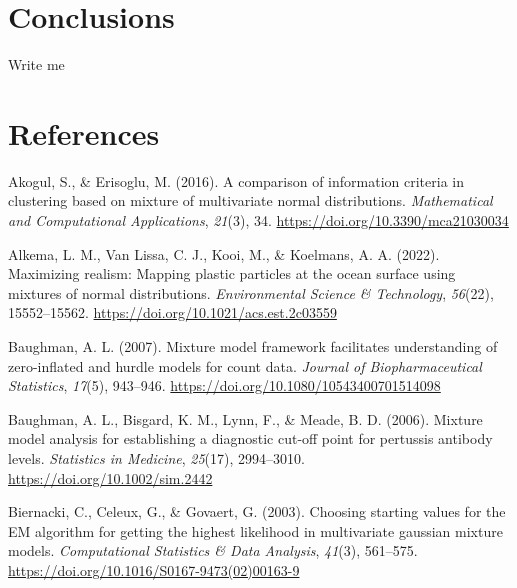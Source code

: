 \documentclass[
  ,man,floatsintext]{apa6}
\newlength{\cslhangindent}
\newlength{\cslentryspacingunit} %
\newenvironment{CSLReferences}[2] %
 {%
  \setlength{\parindent}{0pt}
  \ifodd #1
  \let\oldpar\par
  \def\par{\hangindent=\cslhangindent\oldpar}
  \fi
  \setlength{\parskip}{#2\cslentryspacingunit}
 }%
 {}
\begin{document}
\hypertarget{conclusions}{%
\section{Conclusions}\label{conclusions}}

Write me

\newpage

\hypertarget{references}{%
\section*{References}\label{references}}

\hypertarget{refs}{}
\begin{CSLReferences}{1}{0}
\leavevmode{}%
Akogul, S., \& Erisoglu, M. (2016). A comparison of information criteria in clustering based on mixture of multivariate normal distributions. \emph{Mathematical and Computational Applications}, \emph{21}(3), 34. \url{https://doi.org/10.3390/mca21030034}

\leavevmode{}%
Alkema, L. M., Van Lissa, C. J., Kooi, M., \& Koelmans, A. A. (2022). Maximizing realism: Mapping plastic particles at the ocean surface using mixtures of normal distributions. \emph{Environmental Science \& Technology}, \emph{56}(22), 15552--15562. \url{https://doi.org/10.1021/acs.est.2c03559}

\leavevmode{}%
Baughman, A. L. (2007). Mixture model framework facilitates understanding of zero-inflated and hurdle models for count data. \emph{Journal of Biopharmaceutical Statistics}, \emph{17}(5), 943--946. \url{https://doi.org/10.1080/10543400701514098}

\leavevmode{}%
Baughman, A. L., Bisgard, K. M., Lynn, F., \& Meade, B. D. (2006). Mixture model analysis for establishing a diagnostic cut-off point for pertussis antibody levels. \emph{Statistics in Medicine}, \emph{25}(17), 2994--3010. \url{https://doi.org/10.1002/sim.2442}

\leavevmode{}%
Biernacki, C., Celeux, G., \& Govaert, G. (2003). Choosing starting values for the {EM} algorithm for getting the highest likelihood in multivariate gaussian mixture models. \emph{Computational Statistics \& Data Analysis}, \emph{41}(3), 561--575. \url{https://doi.org/10.1016/S0167-9473(02)00163-9}


\end{CSLReferences}
\end{document}
